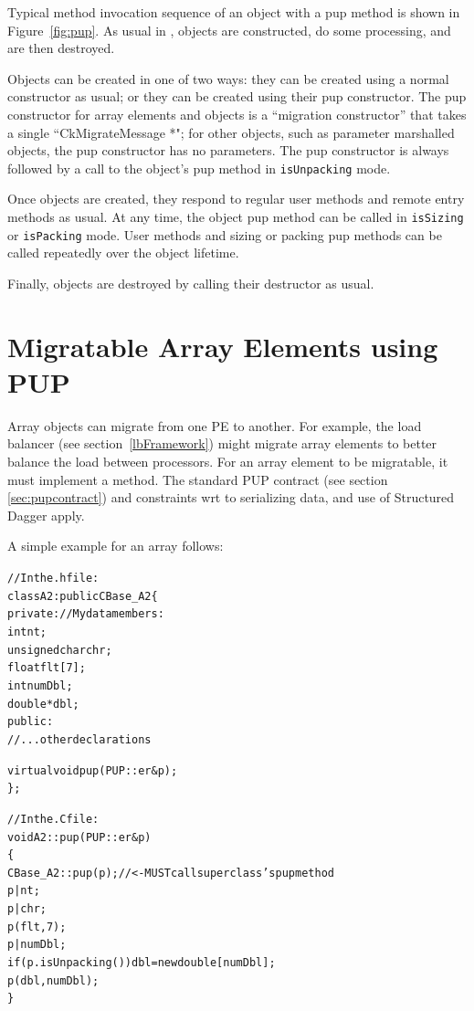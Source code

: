Typical method invocation sequence of an object with a pup method is shown in 
Figure~\ref{fig:pup}.  As usual in \CC{}, objects are 
constructed, do some processing, and are then destroyed.

Objects can be created in one of two ways: they can
be created using a normal constructor as usual; or they
can be created using their pup constructor.  The pup constructor
for \charmpp{} array elements and  objects
is a ``migration constructor'' that takes a single ``CkMigrateMessage *";
for other objects, such as parameter marshalled objects,
the pup constructor has no parameters.  The pup constructor
is always followed by a call to the object's pup method in
\verb.isUnpacking. mode.

Once objects are created, they respond to regular user methods
and remote entry methods as usual.  At any time, the object 
pup method can be called in \verb.isSizing. or \verb.isPacking.
mode.  User methods and sizing or packing pup methods can be called
repeatedly over the object lifetime.

Finally, objects are destroyed by calling their destructor
as usual.


\section{Migratable Array Elements using PUP}

\label{arraymigratable}
Array objects can migrate from one PE to another.  For
example, the load balancer (see section~\ref{lbFramework}) might
migrate array elements to better balance the load between processors.
For an array element to be migratable, it must implement a 
method.  The standard PUP contract (see section \ref{sec:pupcontract})
and constraints wrt to serializing data, and use of Structured Dagger
apply. 


A simple example for an array follows:

\begin{alltt}
//In the .h file:
class A2 : public CBase\_A2 \{
private: //My data members:
    int nt;
    unsigned char chr;
    float flt[7];
    int numDbl;
    double *dbl;
public:	
    //...other declarations

    virtual void pup(PUP::er \&p);
\};

//In the .C file:
void A2::pup(PUP::er \&p)
\{
    CBase\_A2::pup(p); //<- MUST call superclass's pup method
    p|nt;
    p|chr;
    p(flt,7);
    p|numDbl;
    if (p.isUnpacking()) dbl=new double[numDbl];
    p(dbl,numDbl);
\}
\end{alltt}

